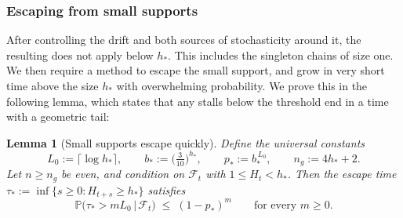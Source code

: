 \documentclass[
    aps,
    superscriptaddress,
    onecolumn,
    10pt,
    prx,
    nofootinbib
]{revtex4-2}
\newtheorem{lemma}{Lemma}
\theoremstyle{namedstatement}
\theoremstyle{plain}
\begin{document}
\subsubsection{Escaping from small supports}\label{sec:growth-escape}
After controlling the drift and both sources of stochasticity around it, 
the resulting  does not apply below $h_\ast$. This includes the singleton chains of size one. We then require a method to escape the small support, and grow in very short time above the size $h_*$ with overwhelming probability. We prove this in the following lemma, which states that any stalls below the threshold end in a time with a geometric tail:
\begin{lemma}[Small supports escape quickly]\label{lem:escape}
Define the universal constants
\begin{equation}\label{eq:escape-constants}
  L_0:=\lceil\log h_\ast\rceil,
  \qquad
  b_\ast:=\big(\tfrac{3}{10}\big)^{h_\ast},
  \qquad
  p_\ast:=b_\ast^{\,L_0},
  \qquad
  n_g:=4h_\ast+2 .
\end{equation}
Let $n\ge n_g$ be even, and condition on $\mathcal F_t$ with $1\le H_t<h_\ast$. Then
the escape time $\tau_\ast:=\inf\{s\ge0:H_{t+s}\ge h_\ast\}$ satisfies
\begin{equation}\label{eq:geom}
  \mathbb P\big(\tau_\ast>mL_0\,\big|\,\mathcal F_t\big)\;\le\;(1-p_\ast)^m
  \qquad\text{for every }m\ge0.
\end{equation}
\end{lemma}
\end{document}
